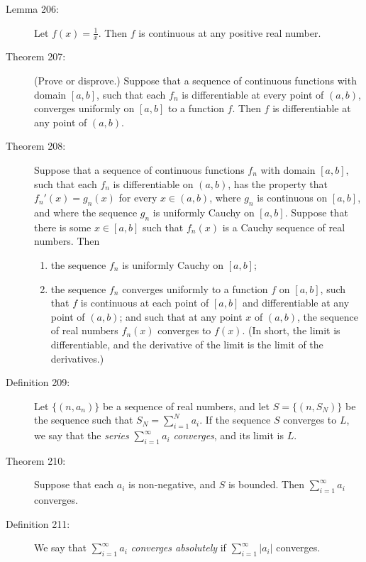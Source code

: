 \documentclass{article}
\begin{document}
\begin{description}
  \item[Lemma 206:] Let $f(x) = \frac{1}{x}$. Then $f$ is continuous at any positive real number.

  \item[Theorem 207:] (Prove or disprove.) Suppose that a sequence of continuous functions with domain $[a,b]$, such that each $f_{n}$ is differentiable at every point of $(a,b)$, converges uniformly on $[a,b]$ to a function $f$. Then $f$ is differentiable at any point of $(a,b)$.

  \item[Theorem 208:] Suppose that a sequence of continuous functions $f_{n}$ with domain $[a,b]$, such that each $f_{n}$ is differentiable on $(a,b)$, has the property that $f_{n}' (x) = g_{n} (x)$ for every $x \in (a,b)$, where $g_{n}$ is continuous on $[a,b]$, and where the sequence $g_{n}$ is uniformly Cauchy on $[a,b]$. Suppose that there is some $x \in [a,b]$ such that $f_{n} (x)$ is a Cauchy sequence of real numbers. Then
    \begin{enumerate}[\hspace{1cm}1.]
      \item the sequence $f_{n}$ is uniformly Cauchy on $[a,b]$;
      \item the sequence $f_{n}$ converges uniformly to a function $f$ on $[a,b]$, such that $f$ is continuous at each point of $[a,b]$ and differentiable at any point of $(a,b)$; and such that at any point $x$ of $(a,b)$, the sequence of real numbers $f_{n} (x)$ converges to $f(x)$. (In short, the limit is differentiable, and the derivative of the limit is the limit of the derivatives.)
    \end{enumerate}

  \item[Definition 209:] Let $\{ (n, a_{n}) \}$ be a sequence of real numbers, and let $S = \{ (n, S_{N}) \}$ be the sequence such that $\displaystyle S_{N} = \sum_{i=1}^{N} a_{i}$. If the sequence $S$ converges to $L$, we say that the \emph{series} $\displaystyle \sum_{i=1}^{\infty} a_{i}$ \emph{converges}, and its limit is $L$.

  \item[Theorem 210:] Suppose that each $a_{i}$ is non-negative, and $S$ is bounded. Then $\displaystyle \sum_{i=1}^{\infty} a_{i}$ converges.

  \item[Definition 211:] We say that $\displaystyle \sum_{i=1}^{\infty} a_{i}$ \emph{converges absolutely} if $\displaystyle \sum_{i=1}^{\infty} |a_{i}|$ converges.


\end{description}
\end{document}
